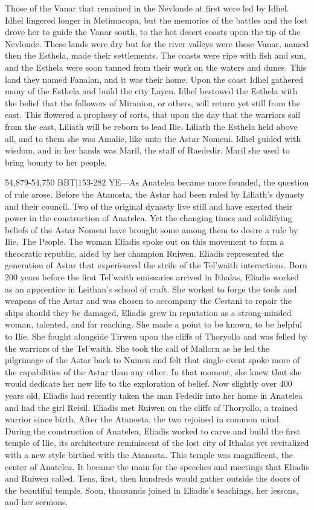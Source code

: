 \documentclass[smalldemyvopaper,11pt,twoside,onecolumn,openright,extrafontsizes]{memoir}
\begin{document}
{{Those of the Vanar that remained in the Nevlonde at first were led by Idhel. Idhel lingered longer in Metimacopa, but the memories of the battles and the lost drove her to guide the Vanar south, to the hot desert coasts upon the tip of the Nevlonde. These lands were dry but for the river valleys were these Vanar, named then the Esthela, made their settlements. The coasts were ripe with fish and sun, and the Esthela were soon tanned from their work on the waters and dunes. This land they named Fanalan, and it was their home. Upon the coast Idhel gathered many of the Esthela and build the city Layen.
Idhel bestowed the Esthela with the belief that the followers of Miranion, or others, will return yet still from the east. This flowered a prophesy of sorts, that upon the day that the warriors sail from the east, Liliath will be reborn to lead Ilie. Liliath the Esthela held above all, and to them she was Amalie, like unto the Astar Nomeni. Idhel guided with wisdom, and in her hands was Maril, the staff of Raededir. Maril she used to bring bounty to her people.

54,879-54,750 BBT|153-282 YE—As Anatelea became more founded, the question of rule arose. Before the Atanosta, the Astar had been ruled by Liliath’s dynasty and their council. Two of the original dynasty live still and have exerted their power in the construction of Anatelea. Yet the changing times and solidifying beliefs of the Astar Nomeni have brought some among them to desire a rule by Ilie, The People. The woman Eliadis spoke out on this movement to form a theocratic republic, aided by her champion Ruiwen.
	Eliadis represented the generation of Astar that experienced the strife of the Tel’waith interactions. Born 200 years before the first Tel’waith emissaries arrived in Ithalas, Eliadis worked as an apprentice in Leithan’s school of craft. She worked to forge the tools and weapons of the Astar and was chosen to accompany the Cestani to repair the ships should they be damaged. Eliadis grew in reputation as a strong-minded woman, talented, and far reaching. She made a point to be known, to be helpful to Ilie. She fought alongside Tirwen upon the cliffs of Thoryollo and was felled by the warriors of the Tel’waith. She took the call of Mallorn as he led the pilgrimage of the Astar back to Nuinen and felt that single event spoke more of the capabilities of the Astar than any other. In that moment, she knew that she would dedicate her new life to the exploration of belief. Now slightly over 400 years old, Eliadis had recently taken the man Fededir into her home in Anatelea and had the girl Reisil.
	Eliadis met Ruiwen on the cliffs of Thoryollo, a trained warrior since birth. After the Atanosta, the two rejoined in common mind. During the construction of Anatelea, Eliadis worked to carve and build the first temple of Ilie, its architecture reminiscent of the lost city of Ithalas yet revitalized with a new style birthed with the Atanosta. This temple was magnificent, the center of Anatelea. It became the main for the speeches and meetings that Eliadis and Ruiwen called. Tens, first, then hundreds would gather outside the doors of the beautiful temple. Soon, thousands joined in Eliadis’s teachings, her lessons, and her sermons.


}}
\end{document}
